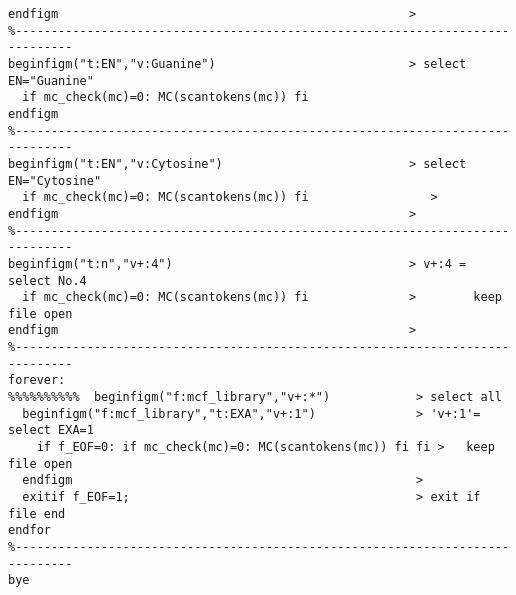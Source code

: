 \documentclass[a4paper]{article}
\begin{document}
\begin{verbatim}
endfigm                                                 >
%------------------------------------------------------------------------------
beginfigm("t:EN","v:Guanine")                           > select EN="Guanine"
  if mc_check(mc)=0: MC(scantokens(mc)) fi                 
endfigm
%------------------------------------------------------------------------------
beginfigm("t:EN","v:Cytosine")                          > select EN="Cytosine"
  if mc_check(mc)=0: MC(scantokens(mc)) fi                 >
endfigm                                                 >
%------------------------------------------------------------------------------
beginfigm("t:n","v+:4")                                 > v+:4 = select No.4
  if mc_check(mc)=0: MC(scantokens(mc)) fi              >        keep file open
endfigm                                                 >
%------------------------------------------------------------------------------
forever:
%%%%%%%%%%  beginfigm("f:mcf_library","v+:*")            > select all
  beginfigm("f:mcf_library","t:EXA","v+:1")              > 'v+:1'= select EXA=1
    if f_EOF=0: if mc_check(mc)=0: MC(scantokens(mc)) fi fi >   keep file open
  endfigm                                                >    
  exitif f_EOF=1;                                        > exit if file end
endfor
%------------------------------------------------------------------------------
bye
\end{verbatim}
\noindent%
\newpage
\end{document}
